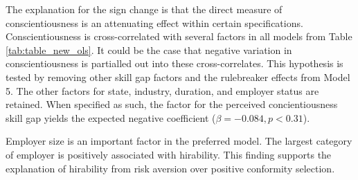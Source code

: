 \documentclass[review]{elsarticle}
\begin{document}
%
The explanation for the sign change is that the direct measure of conscientiousness is an attenuating effect within certain specifications.
Conscientiousness is cross-correlated with several factors in all models from Table \ref{tab:table_new_ols}.
%
It could be the case that negative variation in conscientiousness is partialled out into these cross-correlates.
This hypothesis is tested by removing other skill gap factors and the rulebreaker effects from Model 5.
The other factors for state, industry, duration, and employer status are retained.
When specified as such, the factor for the perceived concientiousness skill gap yields the expected negative coefficient ($\beta = -0.084, p < 0.31$).

Employer size is an important factor in the preferred model.
The largest category of employer is positively associated with hirability.
This finding supports the explanation of hirability from risk aversion over positive conformity selection.
\end{document}

